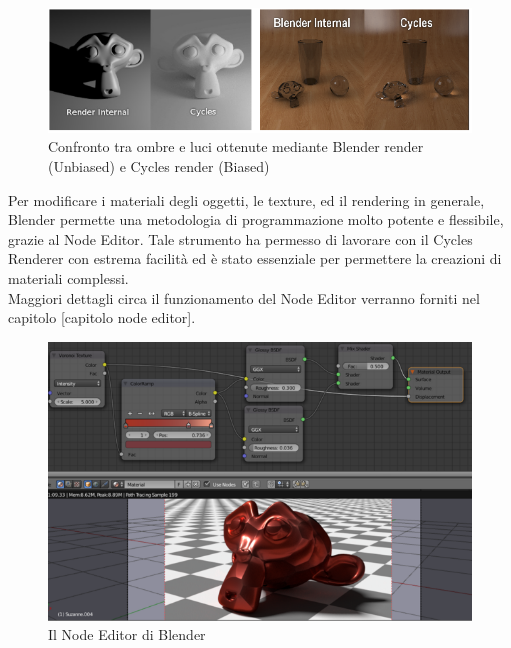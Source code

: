 \\
\begin{figure}[htb]
 \centering
 \includegraphics[width=1\linewidth]{images/chapter_tecnologie_abilitanti/tecnologie_abilitanti_bias_unbias.png}\hfill
 \caption[Cycles render e Blender render]{Confronto tra ombre e luci ottenute mediante Blender render (Unbiased) e Cycles render (Biased)}
 \label{fig:tecnologie_abilitanti_bias_unbias}
\end{figure}

Per modificare i materiali degli oggetti, le texture, ed il rendering in generale, Blender permette una metodologia di programmazione molto potente e flessibile, grazie al Node Editor. Tale strumento ha permesso di lavorare con il Cycles Renderer con estrema facilità ed è stato essenziale per permettere la creazioni di materiali complessi. 
\\
Maggiori dettagli circa il funzionamento del Node Editor verranno forniti nel capitolo [capitolo node editor].
\\
\begin{figure}[htb]
 \centering
 \includegraphics[width=1\linewidth]{images/chapter_tecnologie_abilitanti/tecnologie_abilitanti_node_editor.png}\hfill
 \caption[Blender Node Editor]{Il Node Editor di Blender}
 \label{fig:tecnologie_abilitanti_node_editor}
\end{figure}

